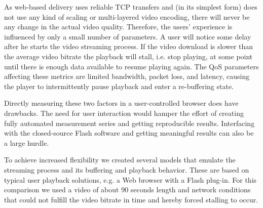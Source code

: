 




As web-based delivery uses reliable TCP transfers and (in its simplest form) does not use any kind of scaling or multi-layered video encoding, there will never be any change in the actual video quality. Therefore, the users' experience is influenced by only a small number of parameters. A user will notice some delay after he starts the video streaming process. If the video download is slower than the average video bitrate the playback will stall, i.e. stop playing, at some point until there is enough data available to resume playing again.
The QoS parameters affecting these metrics are limited bandwidth, packet loss, and latency, causing the player to intermittently pause playback and enter a re-buffering state.

Directly measuring these two factors in a user-controlled browser does have drawbacks. The need for user interaction would hamper the effort of creating fully automated measurement series and getting reproducible results. Interfacing with the closed-source Flash software and getting meaningful results can also be a large hurdle.

To achieve increased flexibility we created several models that emulate the streaming process and its buffering and playback behavior. These are based on typical user playback solutions, e.g. a Web browser with a Flash plug-in. For this comparison we used a video of about 90 seconds length and network conditions that could not fulfill the video bitrate in time and hereby forced stalling to occur.

